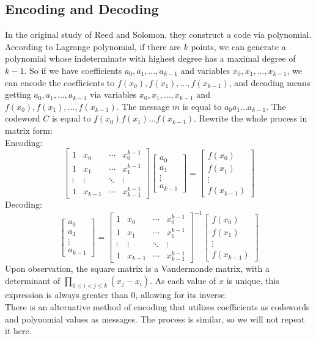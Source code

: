 \documentclass[12pt]{article}
\begin{document}
\subsection{Encoding and Decoding}
In the original study of Reed and Solomon\cite{reed1960polynomial}, they construct a code via polynomial.\\
According to Lagrange polynomial, if there are $k$ points, we can generate a polynomial whose indeterminate with highest degree has a maximal degree of $k-1$. So if we have coefficients $a_0, a_1, \dots, a_{k-1}$ and variables $x_0, x_1, \dots, x_{k-1}$, we can encode the coefficients to $f(x_0), f(x_1), \dots, f(x_{k-1})$, and decoding means getting $a_0, a_1, \dots, a_{k-1}$ via variables $x_0, x_1, \dots, x_{k-1}$ and $f(x_0), f(x_1), \dots, f(x_{k-1})$. The message $m$ is equal to $a_0 a_1 \dots a_{k-1}$. The codeword $C$ is equal to $f(x_0) f(x_1) \dots f(x_{k-1})$. Rewrite the whole process in matrix form:\\
Encoding:
\[
\begin{bmatrix} 
1 & x_0 & \cdots & x_0^{k-1} \\
1 & x_1 & \cdots & x_1^{k-1} \\
\vdots & \vdots & \ddots & \vdots \\ 
1 & x_{k-1} & \cdots & x_{k-1}^{k-1} 
\end{bmatrix} 
\begin{bmatrix} 
a_0 \\ 
a_1 \\ 
\vdots \\ 
a_{k-1} 
\end{bmatrix} 
= 
\begin{bmatrix} 
f(x_{0}) \\ 
f(x_{1}) \\
\vdots \\
f(x_{k-1}) 
\end{bmatrix}
\]
Decoding:
\[
\begin{bmatrix} 
a_0 \\ 
a_1 \\ 
\vdots \\ 
a_{k-1} 
\end{bmatrix} 
= 
\begin{bmatrix} 
1 & x_0 & \cdots & x_0^{k-1} \\
1 & x_1 & \cdots & x_1^{k-1} \\
\vdots & \vdots & \ddots & \vdots \\ 
1 & x_{k-1} & \cdots & x_{k-1}^{k-1} 
\end{bmatrix}^{-1}
\begin{bmatrix} 
f(x_{0}) \\ 
f(x_{1}) \\
\vdots \\
f(x_{k-1}) 
\end{bmatrix}
\]
Upon observation, the square matrix is a Vandermonde matrix, with a determinant of $\prod_{0\leq i < j \leq k}(x_j-x_i)$. As each value of $x$ is unique, this expression is always greater than $0$, allowing for its inverse.\\
There is an alternative method of encoding that utilizes coefficients as codewords and polynomial values as messages. The process is similar, so we will not repeat it here.\\
\end{document}
